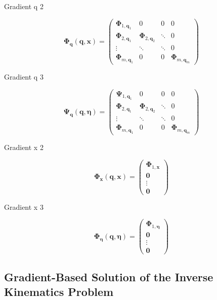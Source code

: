 \documentclass[robotics,article,submit,moreauthors,pdftex]{Definitions/mdpi}
\newcommand{\bm}[1]{\boldsymbol{#1}}
\begin{document}
Gradient q 2

\begin{equation}
\bm{\Phi}_{\bm{q}}(\bm{q},\bm{x})
=
\begin{pmatrix}
\bm{\Phi}_{1,\bm{q}_1}  & 0 & 0 & 0\\
\bm{\Phi}_{2,\bm{q}_1} & \bm{\Phi}_{2,\bm{q}_2} & \ddots & 0  \\
\vdots & \ddots & \ddots & 0  \\
\bm{\Phi}_{m,\bm{q}_1} & 0 & 0 &\bm{\Phi}_{m,\bm{q}_m}
\end{pmatrix}
\end{equation}

Gradient q 3

\begin{equation}
\bm{\Psi}_{\bm{q}}(\bm{q},\bm{\eta})
=
\begin{pmatrix}
\bm{\Psi}_{1,\bm{q}_1}  & 0 & 0 & 0\\
\bm{\Phi}_{2,\bm{q}_1} & \bm{\Phi}_{2,\bm{q}_2} & \ddots & 0  \\
\vdots & \ddots & \ddots & 0  \\
\bm{\Phi}_{m,\bm{q}_1} & 0 & 0 &\bm{\Phi}_{m,\bm{q}_m}
\end{pmatrix}
\end{equation}


Gradient x 2

\begin{equation}
\bm{\Phi}_{\bm{x}}(\bm{q},\bm{x})
=
\begin{pmatrix}
\bm{\Phi}_{1,\bm{x}} \\
\bm{0} \\
\vdots \\
\bm{0}
\end{pmatrix}
\end{equation}


Gradient x 3

\begin{equation}
\bm{\Phi}_{\bm{\eta}}(\bm{q},\bm{\eta})
=
\begin{pmatrix}
\bm{\Phi}_{1,\bm{\eta}} \\
\bm{0} \\
\vdots \\
\bm{0}
\end{pmatrix}
\end{equation}

\subsection{Gradient-Based Solution of the Inverse Kinematics Problem}
\end{document}
